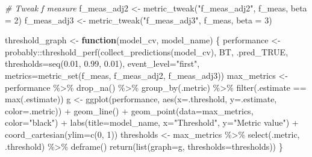 \documentclass[
]{article}
\newenvironment{Shaded}{\begin{snugshade}}{\end{snugshade}}
\newcommand{\AttributeTok}[1]{\textcolor[rgb]{0.77,0.63,0.00}{#1}}
\newcommand{\CommentTok}[1]{\textcolor[rgb]{0.56,0.35,0.01}{\textit{#1}}}
\newcommand{\ControlFlowTok}[1]{\textcolor[rgb]{0.13,0.29,0.53}{\textbf{#1}}}
\newcommand{\DecValTok}[1]{\textcolor[rgb]{0.00,0.00,0.81}{#1}}
\newcommand{\FloatTok}[1]{\textcolor[rgb]{0.00,0.00,0.81}{#1}}
\newcommand{\FunctionTok}[1]{\textcolor[rgb]{0.00,0.00,0.00}{#1}}
\newcommand{\NormalTok}[1]{#1}
\newcommand{\OtherTok}[1]{\textcolor[rgb]{0.56,0.35,0.01}{#1}}
\newcommand{\SpecialCharTok}[1]{\textcolor[rgb]{0.00,0.00,0.00}{#1}}
\newcommand{\StringTok}[1]{\textcolor[rgb]{0.31,0.60,0.02}{#1}}
\begin{document}
\begin{Shaded}
\begin{Highlighting}[]
\CommentTok{\# Tweak f measure}
\NormalTok{f\_meas\_adj2 }\OtherTok{\textless{}{-}} \FunctionTok{metric\_tweak}\NormalTok{(}\StringTok{"f\_meas\_adj2"}\NormalTok{, f\_meas, }\AttributeTok{beta =} \DecValTok{2}\NormalTok{)}
\NormalTok{f\_meas\_adj3 }\OtherTok{\textless{}{-}} \FunctionTok{metric\_tweak}\NormalTok{(}\StringTok{"f\_meas\_adj3"}\NormalTok{, f\_meas, }\AttributeTok{beta =} \DecValTok{3}\NormalTok{)}

\NormalTok{threshold\_graph }\OtherTok{\textless{}{-}} \ControlFlowTok{function}\NormalTok{(model\_cv, model\_name) \{}
\NormalTok{    performance }\OtherTok{\textless{}{-}}\NormalTok{ probably}\SpecialCharTok{::}\FunctionTok{threshold\_perf}\NormalTok{(}\FunctionTok{collect\_predictions}\NormalTok{(model\_cv), BT, .pred\_TRUE,}
        \AttributeTok{thresholds=}\FunctionTok{seq}\NormalTok{(}\FloatTok{0.01}\NormalTok{, }\FloatTok{0.99}\NormalTok{, }\FloatTok{0.01}\NormalTok{), }\AttributeTok{event\_level=}\StringTok{"first"}\NormalTok{,}
        \AttributeTok{metrics=}\FunctionTok{metric\_set}\NormalTok{(f\_meas, f\_meas\_adj2, f\_meas\_adj3))}
\NormalTok{    max\_metrics }\OtherTok{\textless{}{-}}\NormalTok{ performance }\SpecialCharTok{\%\textgreater{}\%}
        \FunctionTok{drop\_na}\NormalTok{() }\SpecialCharTok{\%\textgreater{}\%}
        \FunctionTok{group\_by}\NormalTok{(.metric) }\SpecialCharTok{\%\textgreater{}\%}
        \FunctionTok{filter}\NormalTok{(.estimate }\SpecialCharTok{==} \FunctionTok{max}\NormalTok{(.estimate))}
\NormalTok{    g }\OtherTok{\textless{}{-}} \FunctionTok{ggplot}\NormalTok{(performance, }\FunctionTok{aes}\NormalTok{(}\AttributeTok{x=}\NormalTok{.threshold, }\AttributeTok{y=}\NormalTok{.estimate, }\AttributeTok{color=}\NormalTok{.metric)) }\SpecialCharTok{+}
        \FunctionTok{geom\_line}\NormalTok{() }\SpecialCharTok{+}
        \FunctionTok{geom\_point}\NormalTok{(}\AttributeTok{data=}\NormalTok{max\_metrics, }\AttributeTok{color=}\StringTok{"black"}\NormalTok{) }\SpecialCharTok{+}
        \FunctionTok{labs}\NormalTok{(}\AttributeTok{title=}\NormalTok{model\_name, }\AttributeTok{x=}\StringTok{"Threshold"}\NormalTok{, }\AttributeTok{y=}\StringTok{"Metric value"}\NormalTok{) }\SpecialCharTok{+}
        \FunctionTok{coord\_cartesian}\NormalTok{(}\AttributeTok{ylim=}\FunctionTok{c}\NormalTok{(}\DecValTok{0}\NormalTok{, }\DecValTok{1}\NormalTok{))}
\NormalTok{    thresholds }\OtherTok{\textless{}{-}}\NormalTok{ max\_metrics }\SpecialCharTok{\%\textgreater{}\%}
        \FunctionTok{select}\NormalTok{(.metric, .threshold) }\SpecialCharTok{\%\textgreater{}\%}
        \FunctionTok{deframe}\NormalTok{()}
    \FunctionTok{return}\NormalTok{(}\FunctionTok{list}\NormalTok{(}\AttributeTok{graph=}\NormalTok{g, }\AttributeTok{thresholds=}\NormalTok{thresholds))}
\NormalTok{\}}


\end{Highlighting}
\end{Shaded}
\end{document}
